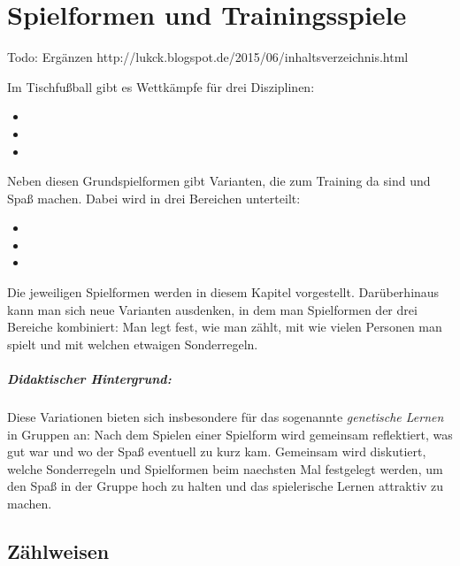\chapter{Spielformen und Trainingsspiele}
\label{spielformen}

Todo: Ergänzen http://lukck.blogspot.de/2015/06/inhaltsverzeichnis.html

Im Tischfußball gibt es Wettkämpfe für drei Disziplinen: 
\begin{itemize}
\item {}
\item {}
\item {}
\end{itemize}
Neben diesen Grundspielformen gibt Varianten, die zum Training da sind und Spaß machen. Dabei wird in drei Bereichen unterteilt:
\begin{itemize}
\item {}
\item {}
\item {}
\end{itemize}
Die jeweiligen Spielformen werden in diesem Kapitel vorgestellt. Darüberhinaus kann man sich neue Varianten ausdenken, in dem man Spielformen der drei Bereiche kombiniert: Man legt fest, wie man zählt, mit wie vielen Personen man spielt und mit welchen etwaigen Sonderregeln.

\paragraph{Didaktischer Hintergrund:} Diese Variationen bieten sich insbesondere für das sogenannte {\it  genetische Lernen} in Gruppen an: Nach dem Spielen einer Spielform wird gemeinsam reflektiert, was gut war und wo der Spaß eventuell zu kurz kam. Gemeinsam wird diskutiert, welche Sonderregeln und Spielformen beim naechsten Mal festgelegt werden, um den Spaß in der Gruppe hoch zu halten und das spielerische Lernen attraktiv zu machen. 

\section{Zählweisen}
\label{spielformen:zaehlweisen}

